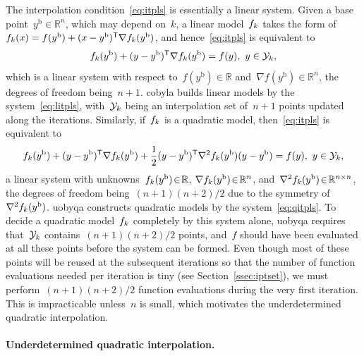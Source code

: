 \documentclass{article}
\numberwithin{equation}{section}
\theoremstyle{definition}
\theoremstyle{plain}
\theoremstyle{remark}
\newcommand*{\R}{\mathbb{R}}
\newcommand*{\T}{\mathsf{T}}
\newcommand{\base}{{\text{b}}}
\newcommand{\objm}[1][k]{\obj\ifthenelse{\equal{#1}{}}{}{_{#1}}}
\newcommand{\obj}{f}
\newcommand{\xpt}[1][k]{\mathcal{Y}\ifthenelse{\equal{#1}{}}{}{_{#1}}}
\begin{document}
The interpolation condition~\eqref{eq:itpls} is essentially a linear system.
Given a base point~$y^{\base}\in \R^n$, which may depend on~$k$, a linear model~$\objm$ takes the form of~$\objm(x) = \obj(y^{\base}) + (x - y^{\base})^{\T} \nabla \objm(y^{\base})$, and hence~\eqref{eq:itpls} is equivalent to
\begin{equation}
    \label{eq:litpls}
    \objm(y^{\base}) + (y -y^{\base})^{\T} \nabla \objm(y^{\base}) = \obj(y), ~ y \in \xpt,
\end{equation}
which is a linear system with respect to~$\obj(y^\base) \in \R$ and~$\nabla \obj(y^\base) \in \R^n$, the degrees of freedom being~$n + 1$.
\Gls{cobyla} builds linear models by the system~\eqref{eq:litpls}, with~$\xpt$ being an interpolation set of~$n+1$ points updated along the iterations.
Similarly, if~$\objm$ is a quadratic model, then~\eqref{eq:itpls} is equivalent to
\begin{equation}
    \label{eq:qitpls}
    \objm(y^{\base}) + (y -y^{\base})^{\T} \nabla \objm(y^{\base}) + \frac{1}{2}(y-y^{\base})^{\T} \nabla^2 \objm(y^{\base}) (y-y^{\base}) = \obj(y), ~ y \in \xpt,
\end{equation}
a linear system with unknowns~$\objm(y^\base) \! \in \! \R$, $\nabla \objm(y^\base) \! \in \! \R^n$, and~$\nabla^2 \objm(y^{\base}) \! \in \! \R^{n \times n}$, the degrees of freedom being~$(n + 1)(n + 2) / 2$ due to the symmetry of~$\nabla^2 \objm(y^\base)$.
\Gls{uobyqa} constructs quadratic models by the system~\eqref{eq:qitpls}.
To decide a quadratic model~$\objm$ completely by this system alone, \gls{uobyqa} requires that~$\xpt$ contains~$(n+1)(n+2)/2$ points, and~$f$ should have been evaluated at all these points before the system can be formed.
Even though most of these points will be reused at the subsequent iterations so that the number of function evaluations needed per iteration is tiny (see Section~\ref{ssec:iptset}), we must perform~$(n + 1)(n + 2) / 2$ function evaluations during the very first iteration.
This is impracticable unless~$n$ is small, which motivates the underdetermined quadratic interpolation.

\paragraph{Underdetermined quadratic interpolation.}
\end{document}
